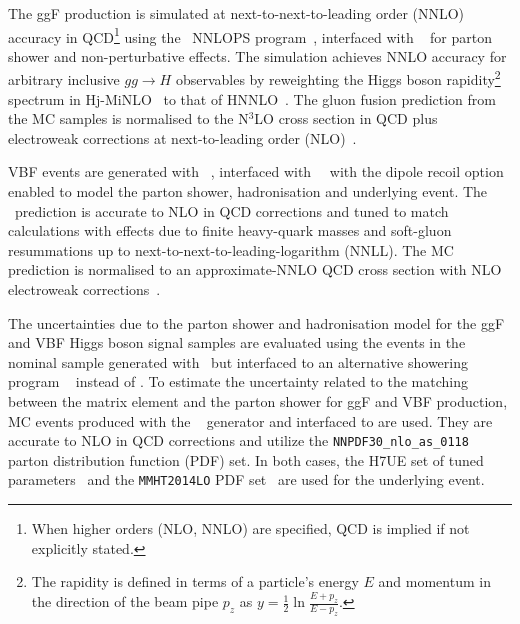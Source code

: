 The ggF production is simulated at next-to-next-to-leading order (NNLO) accuracy in QCD\footnote{When higher orders (NLO, NNLO) are specified, QCD is implied if not explicitly stated.} using the \POWHEG~NNLOPS program~\cite{Nason:2004rx, Frixione:2007vw, Alioli:2010xd, Hamilton:2013fea, Hamilton:2015nsa}, interfaced with ~\cite{Sjostrand:2014zea} for parton shower and non-perturbative effects.
The simulation achieves NNLO accuracy for arbitrary inclusive $gg\to H$ observables by reweighting the Higgs boson rapidity\footnote{The rapidity is defined in terms of a particle's energy $E$ and momentum in the direction of the beam pipe $p_z$ as $y = \frac{1}{2}\ln\frac{E+p_z}{E-p_z}$.} spectrum in Hj-MiNLO~\cite{Hamilton:2012np, Campbell:2012am, Hamilton:2012rf} to that of HNNLO~\cite{Catani:2007vq}.
The gluon fusion prediction from the MC samples is normalised to the N$^3$LO cross section in QCD plus electroweak corrections at next-to-leading order (NLO)~\cite{deFlorian:2016spz, Anastasiou:2016cez, Anastasiou:2015vya, Dulat:2018rbf, Harlander:2009mq, Harlander:2009bw, Harlander:2009my, Pak:2009dg, Actis:2008ug, Actis:2008ts, Bonetti:2018ukf}.

VBF events are generated with \POWHEG~\cite{Nason:2004rx, Frixione:2007vw, Alioli:2010xd, Nason:2009ai}, interfaced with ~\cite{Sjostrand:2014zea}~with the dipole recoil option enabled to model the parton shower, hadronisation and underlying event.
The \POWHEG\ prediction is accurate to NLO in QCD corrections and tuned to match calculations with effects due to finite heavy-quark masses and soft-gluon resummations up to next-to-next-to-leading-logarithm (NNLL).
The MC prediction is normalised to an approximate-NNLO QCD cross section with NLO electroweak corrections~\cite{PhysRevLett.99.161803, Ciccolini:2007ec, PhysRevLett.105.011801}.

The uncertainties due to the parton shower and hadronisation model for the ggF and VBF Higgs boson signal samples are
evaluated using the events in the nominal sample generated with \POWHEG\ but interfaced to an alternative showering program
~\cite{Bahr:2008pv,Bellm:2015jjp} instead of . To estimate the uncertainty related to the matching between the matrix element and the parton shower for ggF and VBF production, MC events produced with the \MGFiveNLO~\cite{Alwall:2014hca} generator and interfaced to  are used. They are accurate to NLO in QCD corrections and utilize the \texttt{NNPDF30\_nlo\_as\_0118}~\cite{Ball:2014uwa} parton distribution function (PDF) set.
In both cases, the H7UE set of tuned parameters~\cite{Bellm:2015jjp} and the \texttt{MMHT2014LO} PDF set~\cite{Harland-Lang:2014zoa} are used for the underlying event.


